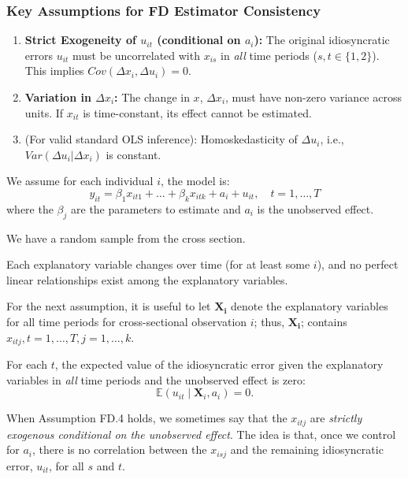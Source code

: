 \documentclass[a4paper, 10pt]{article}
\theoremstyle{definition}	%
\begin{document}
\subsubsection{Key Assumptions for FD Estimator Consistency}
\begin{enumerate}
    \item \textbf{Strict Exogeneity of \(u_{it}\) (conditional on \(a_i\)):} The original idiosyncratic errors \(u_{it}\) must be uncorrelated with \(x_{is}\) in \textit{all} time periods (\(s,t \in \{1,2\}\)). This implies \(Cov(\Delta x_i, \Delta u_i) = 0\).
    \item \textbf{Variation in \(\Delta x_i\):} The change in \(x\), \(\Delta x_i\), must have non-zero variance across units. If \(x_{it}\) is time-constant, its effect cannot be estimated.
    \item (For valid standard OLS inference): Homoskedasticity of \(\Delta u_i\), i.e., \(Var(\Delta u_i | \Delta x_i)\) is constant.
\end{enumerate}
\begin{tcolorbox}[colback=blue!5!white, colframe=blue!80!black, title=Assumption FD.1 (Model Structure)]
We assume for each individual \( i \), the model is:
\[
y_{it} = \beta_1 x_{it1} + \dots + \beta_k x_{itk} + a_i + u_{it}, \quad t = 1, \dots, T
\]
where the $\beta_j$ are the parameters to estimate and $a_i$ is the unobserved effect.
\end{tcolorbox}

\begin{tcolorbox}[colback=blue!5!white, colframe=blue!80!black, title=Assumption FD.2 (Random Sampling)]
We have a random sample from the cross section.
\end{tcolorbox}

\begin{tcolorbox}[colback=blue!5!white, colframe=blue!80!black, title=Assumption FD.3 (Time Variation and No Perfect Collinearity)]
Each explanatory variable changes over time (for at least some \( i \)), and no perfect linear relationships exist among the explanatory variables.
\end{tcolorbox}
For the next assumption, it is useful to let $\mathbf{X_i}$ denote the explanatory variables for all time periods for cross-sectional observation $i$; thus, $\mathbf{X_i}$; contains $x_{itj}, t = 1,\ldots, T, j = 1,\ldots, k$.

\begin{tcolorbox}[colback=blue!5!white, colframe=blue!80!black, title=Assumption FD.4 (Strict Exogeneity)]
For each \( t \), the expected value of the idiosyncratic error given the explanatory variables in \emph{all} time periods and the unobserved effect is zero:
\[
\mathbb{E}(u_{it} \mid \mathbf{X}_i, a_i) = 0.
\]
\end{tcolorbox}
When Assumption FD.4 holds, we sometimes say that the \( x_{itj} \) are \textit{strictly exogenous conditional on the unobserved effect}. The idea is that, once we control for \( a_i \), there is no correlation between the \( x_{isj} \) and the remaining idiosyncratic error, \( u_{it} \), for all \( s \) and \( t \).
\end{document}
